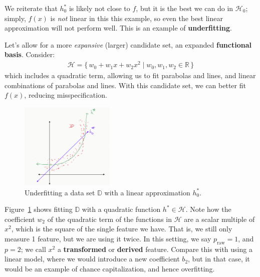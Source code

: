 \documentclass[12pt, a4paper]{article}
\theoremstyle{definition}
\begin{document}
	We reiterate that $h_0^*$ is likely not close to $f$, but it is the best we can do in
	$\mathcal{H}_0$; simply, $f(x)$ is \textit{not} linear in this this example, so
	even the best linear approximation will not perform well. This is an example of
	\textbf{underfitting}.
	
	Let's allow for a more \textit{expansive} (larger) candidate set, an expanded
	\textbf{functional basis}. Consider:
	\begin{align*}
		\mathcal{H} = \{\, w_0 + w_1x + w_2x^2 \mid w_0,w_1,w_2\in\mathbb{R}\,\}
	\end{align*}
	which includes a quadratic term, allowing us to fit parabolas and lines, and
	linear combinations of parabolas and lines. With this candidate set,
	we can better fit $f(x)$, reducing misspecification.
	\begin{figure}
		\centering
		\includegraphics[width=0.4\textwidth]{better-fit-with-quadratic-function}
		\caption{Underfitting a data set $\mathbb{D}$ with a linear approximation
			$h_0^*$.}
		\label{fig:better-fit-D-with-quadratic}
	\end{figure}
	Figure~\ref{fig:better-fit-D-with-quadratic} shows fitting $\mathbb{D}$ with
	a quadratic function $h^*\in \mathcal{H}$. Note how the coefficient $w_2$
	of the quadratic term of the functions in $\mathcal{H}$ are a scalar
	multiple of $x^2$, which is the square of the single feature we have.
	That is, we still only measure 1 feature, but we are using it twice. In this
	setting, we say $p_{\text{raw}} = 1$, and $p=2$; we call $x^2$ a \textbf{transformed}
	or \textbf{derived} feature. Compare this with using a linear model, where we
	would introduce a new coefficient $b_2$, but in that case, it would be an example
	of chance capitalization, and hence overfitting.
	
\end{document}
